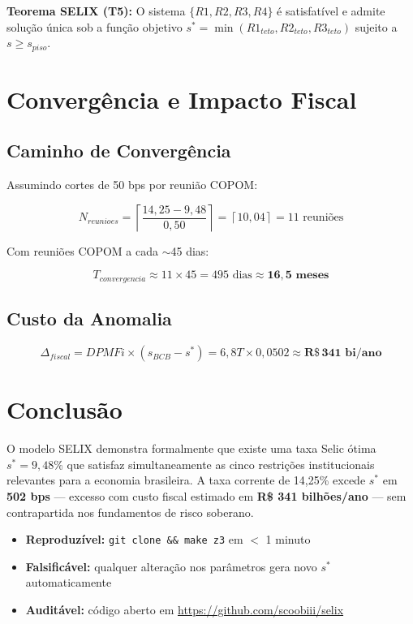 \documentclass[12pt,a4paper]{article}
\begin{document}
\textbf{Teorema SELIX (T5):} O sistema $\{R1, R2, R3, R4\}$ é satisfatível e admite solução única sob a função objetivo $s^* = \min(R1_{teto}, R2_{teto}, R3_{teto})$ sujeito a $s \geq s_{piso}$.

\section{Convergência e Impacto Fiscal}

\subsection{Caminho de Convergência}

Assumindo cortes de 50 bps por reunião COPOM:

\[
N_{reunioes} = \left\lceil \frac{14,25 - 9,48}{0,50} \right\rceil = \left\lceil 10,04 \right\rceil = 11 \text{ reuniões}
\]

Com reuniões COPOM a cada $\sim$45 dias:

\[
T_{convergencia} \approx 11 \times 45 = 495 \text{ dias} \approx \mathbf{16,5 \text{ meses}}
\]

\subsection{Custo da Anomalia}

\[
\Delta_{fiscal} = DPMFi \times (s_{BCB} - s^*) = 6,8T \times 0,0502 \approx \mathbf{R\$\, 341 \text{ bi/ano}}
\]

\section{Conclusão}

O modelo SELIX demonstra formalmente que existe uma taxa Selic ótima $s^* = 9,48\%$ que satisfaz simultaneamente as cinco restrições institucionais relevantes para a economia brasileira. A taxa corrente de 14,25\% excede $s^*$ em \textbf{502 bps} — excesso com custo fiscal estimado em \textbf{R\$ 341 bilhões/ano} — sem contrapartida nos fundamentos de risco soberano.

\begin{itemize}
    \item \textbf{Reproduzível:} \texttt{git clone \&\& make z3} em $<$ 1 minuto
    \item \textbf{Falsificável:} qualquer alteração nos parâmetros gera novo $s^*$ automaticamente
    \item \textbf{Auditável:} código aberto em \url{https://github.com/scoobiii/selix}
\end{itemize}
\end{document}
